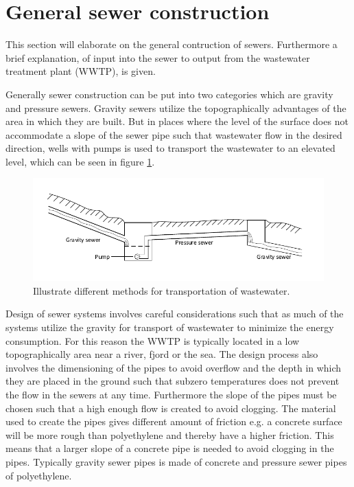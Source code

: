 \section{General sewer construction}\label{se:sewer_construction}
This section will elaborate on the general contruction of sewers. Furthermore a brief explanation, of input into the sewer to output from the wastewater treatment plant (WWTP), is given.


Generally sewer construction can be put into two categories which are gravity and pressure sewers. Gravity sewers utilize the topographically advantages of the area in which they are built. But in places where the level of the surface does not accommodate a slope of the sewer pipe such that wastewater flow in the desired direction, wells with pumps is used to transport the wastewater to an elevated level, which can be seen in figure \ref{fig:Sewer_drawing}. 

\begin{figure}[H]
\centering
\includegraphics[width=1\textwidth]{report/introduction/pictures/Sewer_drawing.pdf}
\caption{Illustrate different methods for transportation of wastewater.}
\label{fig:Sewer_drawing}
\end{figure}

Design of sewer systems involves careful considerations such that as much of the systems utilize the gravity for transport of wastewater to minimize the energy consumption. For this reason the WWTP is typically located in a low topographically area near a river, fjord or the sea. The design process also involves the dimensioning of the pipes to avoid overflow and the depth in which they are placed in the ground such that subzero temperatures does not prevent the flow in the sewers at any time. Furthermore the slope of the pipes must be chosen such that a high enough flow is created to avoid clogging. The material used to create the pipes gives different amount of friction e.g. a concrete surface will be more rough than polyethylene and thereby have a higher friction. This means that a larger slope of a concrete pipe is needed to avoid clogging in the pipes. Typically gravity sewer pipes is made of concrete and pressure sewer pipes of polyethylene.


